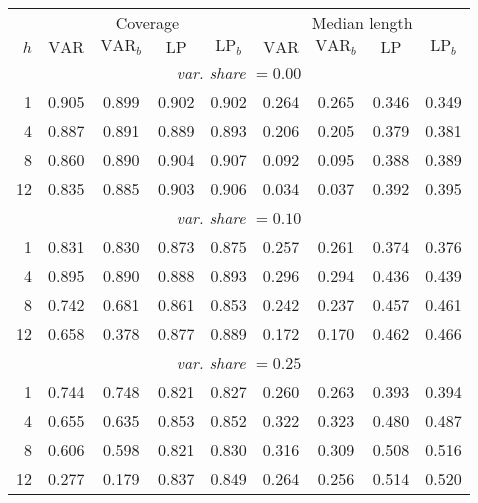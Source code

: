 \begin{tabular}{r|cccc|cccc}
& \multicolumn{4}{c|}{Coverage} & \multicolumn{4}{c}{Median length} \\
$h$ & $\text{VAR}$ & $\text{VAR}_b$ & $\text{LP}$ & $\text{LP}_b$ & $\text{VAR}$ & $\text{VAR}_b$ & $\text{LP}$ & $\text{LP}_b$ \\
\hline
\multicolumn{9}{c}{\emph{var. share $= 0.00$}} \\
  1 & 0.905 & 0.899 & 0.902 & 0.902 & 0.264 & 0.265 & 0.346 & 0.349 \\
  4 & 0.887 & 0.891 & 0.889 & 0.893 & 0.206 & 0.205 & 0.379 & 0.381 \\
  8 & 0.860 & 0.890 & 0.904 & 0.907 & 0.092 & 0.095 & 0.388 & 0.389 \\
 12 & 0.835 & 0.885 & 0.903 & 0.906 & 0.034 & 0.037 & 0.392 & 0.395 \\
\multicolumn{9}{c}{\emph{var. share $= 0.10$}} \\
  1 & 0.831 & 0.830 & 0.873 & 0.875 & 0.257 & 0.261 & 0.374 & 0.376 \\
  4 & 0.895 & 0.890 & 0.888 & 0.893 & 0.296 & 0.294 & 0.436 & 0.439 \\
  8 & 0.742 & 0.681 & 0.861 & 0.853 & 0.242 & 0.237 & 0.457 & 0.461 \\
 12 & 0.658 & 0.378 & 0.877 & 0.889 & 0.172 & 0.170 & 0.462 & 0.466 \\
\multicolumn{9}{c}{\emph{var. share $= 0.25$}} \\
  1 & 0.744 & 0.748 & 0.821 & 0.827 & 0.260 & 0.263 & 0.393 & 0.394 \\
  4 & 0.655 & 0.635 & 0.853 & 0.852 & 0.322 & 0.323 & 0.480 & 0.487 \\
  8 & 0.606 & 0.598 & 0.821 & 0.830 & 0.316 & 0.309 & 0.508 & 0.516 \\
 12 & 0.277 & 0.179 & 0.837 & 0.849 & 0.264 & 0.256 & 0.514 & 0.520 \\
\end{tabular}